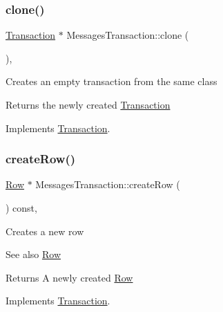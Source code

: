 \subsubsection{\texorpdfstring{clone()}{clone()}}
{\footnotesize\ttfamily \mbox{\hyperlink{classTransaction}{Transaction}} $\ast$ Messages\+Transaction\+::clone (\begin{DoxyParamCaption}{ }\end{DoxyParamCaption})\hspace{0.3cm}{\ttfamily [override]}, {\ttfamily [virtual]}}

Creates an empty transaction from the same class

\begin{DoxyReturn}{Returns}
the newly created \mbox{\hyperlink{classTransaction}{Transaction}} 
\end{DoxyReturn}


Implements \mbox{\hyperlink{classTransaction_ad6ee9c5e4067b2f5c950c6aad131b3e4}{Transaction}}.

\mbox{\label{classMessagesTransaction_a3eec18f09aa102b3cee7f215c225a8fb}} 
\subsubsection{\texorpdfstring{create\+Row()}{createRow()}}
{\footnotesize\ttfamily \mbox{\hyperlink{classRow}{Row}} $\ast$ Messages\+Transaction\+::create\+Row (\begin{DoxyParamCaption}{ }\end{DoxyParamCaption}) const\hspace{0.3cm}{\ttfamily [override]}, {\ttfamily [virtual]}}

Creates a new row \begin{DoxySeeAlso}{See also}
\mbox{\hyperlink{classRow}{Row}}
\end{DoxySeeAlso}
\begin{DoxyReturn}{Returns}
A newly created \mbox{\hyperlink{classRow}{Row}} 
\end{DoxyReturn}


Implements \mbox{\hyperlink{classTransaction_aa80b621537fe480dcb4444bba703abe5}{Transaction}}.

\mbox{\label{classMessagesTransaction_a8cf65215291254275a1dd989f0971bd4}} 
